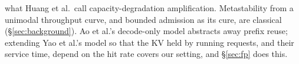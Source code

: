 what Huang et al.\ call capacity-degradation amplification. Metastability from a unimodal throughput curve, and bounded admission as its cure, are classical (\S\ref{sec:background}). Ao et al.'s decode-only model abstracts away prefix reuse; extending Yao et al.'s model so that the KV held by running requests, and their service time, depend on the hit rate covers our setting, and \S\ref{sec:fp} does this.
